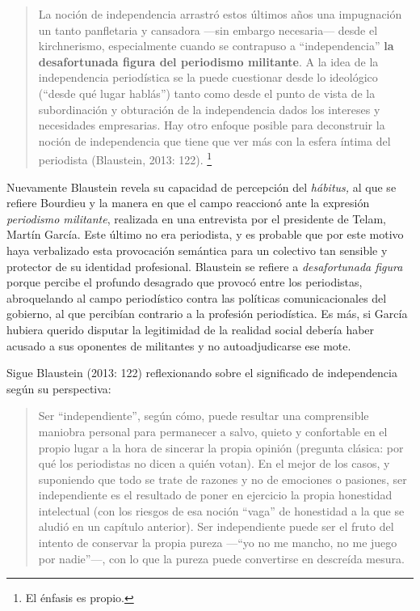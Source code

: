 \begin{quote}
La noción de independencia arrastró estos últimos años una impugnación un tanto panfletaria y cansadora ---sin embargo necesaria--- desde el kirchnerismo, especialmente cuando se contrapuso a \enquote{independencia} \textbf{la desafortunada figura del periodismo militante}. A la idea de la independencia periodística se la puede cuestionar desde lo ideológico (\enquote{desde qué lugar hablás}) tanto como desde el punto de vista de la subordinación y obturación de la independencia dados los intereses y necesidades empresarias. Hay otro enfoque posible para deconstruir la noción de independencia que tiene que ver más con la esfera íntima del periodista (Blaustein, 2013: 122). \footnote{El énfasis es propio.}
\end{quote}

Nuevamente Blaustein revela su capacidad de percepción del \emph{hábitus,} al que se refiere Bourdieu y la manera en que el campo reaccionó ante la expresión \emph{periodismo militante}, realizada en una entrevista por el presidente de Telam, Martín García. Este último no era periodista, y es probable que por este motivo haya verbalizado esta provocación semántica para un colectivo tan sensible y protector de su identidad profesional. Blaustein se refiere a \emph{desafortunada figura} porque percibe el profundo desagrado que provocó entre los periodistas, abroquelando al campo periodístico contra las políticas comunicacionales del gobierno, al que percibían contrario a la profesión periodística. Es más, si García hubiera querido disputar la legitimidad de la realidad social debería haber acusado a sus oponentes de militantes y no autoadjudicarse ese mote.

Sigue Blaustein (2013: 122) reflexionando sobre el significado de independencia según su perspectiva:

\begin{quote}
Ser \enquote{independiente}, según cómo, puede resultar una comprensible maniobra personal para permanecer a salvo, quieto y confortable en el propio lugar a la hora de sincerar la propia opinión (pregunta clásica: por qué los periodistas no dicen a quién votan). En el mejor de los casos, y suponiendo que todo se trate de razones y no de emociones o pasiones, ser independiente es el resultado de poner en ejercicio la propia honestidad intelectual (con los riesgos de esa noción \enquote{vaga} de honestidad a la que se aludió en un capítulo anterior). Ser independiente puede ser el fruto del intento de conservar la propia pureza ---\enquote{yo no me mancho, no me juego por nadie}---, con lo que la pureza puede convertirse en descreída mesura.
\end{quote}

